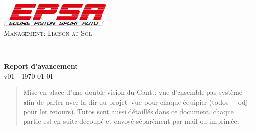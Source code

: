 \documentclass[]{article} %
\begin{document}
\begin{titlepage}
	
	\newcommand{\HRule}{\rule{\linewidth}{0.5mm}} %
	
	\center %
	    \includegraphics[height=1.2cm]{logo}
	\\[1cm]
	\textsc{\LARGE Management: Liaison au Sol} 
	\HRule \\[0.4cm]
	{ \huge \bfseries Report d'avancement}  \\[1cm] %
	
	 {\large v01 - \today}\\[1cm] 
	\begin{abstract}
		Mise en place d'une double vision du Gantt: vue d'ensemble pas système afin de parler avec la dir du projet. vue pour chaque équipier (todos + odj pour ler retours). Tutos sont aussi détaillés dans ce document. chaque partie est en suite découpé et envoyé séparément par mail ou imprimée.
	\end{abstract}

\end{titlepage}









%
\end{document}
